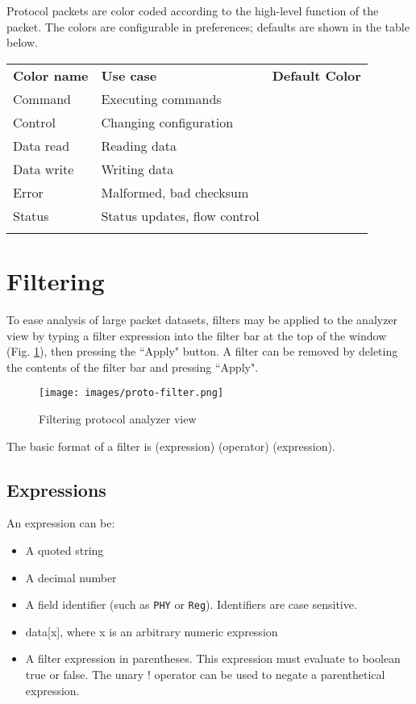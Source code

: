 Protocol packets are color coded according to the high-level function of the packet. The colors are configurable in
preferences; defaults are shown in the table below.

\begin{tabularx}{16cm}{llX}
\thickhline
\textbf{Color name} & \textbf{Use case} & \textbf{Default Color} \\
\thickhline
Command & Executing commands & \cellcolor{protocmd}\textcolor{white}{\#600050} \\
\thinhline
Control & Changing configuration & \cellcolor{protoctl}\textcolor{white}{\#808000} \\
\thinhline
Data read & Reading data & \cellcolor{protoread}\textcolor{white}{\#336699} \\
\thinhline
Data write & Writing data & \cellcolor{protowrite}\textcolor{white}{\#339966} \\
\thinhline
Error & Malformed, bad checksum & \cellcolor{protoerror}\textcolor{white}{\#ff0000} \\
\thinhline
Status & Status updates, flow control & \cellcolor{protostatus}\textcolor{white}{\#000080} \\
\thickhline
\end{tabularx}

\section{Filtering}

To ease analysis of large packet datasets, filters may be applied to the analyzer view by typing a filter expression
into the filter bar at the top of the window (Fig. \ref{proto-filter}), then pressing the ``Apply" button. A filter can
be removed by deleting the contents of the filter bar and pressing ``Apply".

\begin{figure}[H]
\centering
\texttt{[image: images/proto-filter.png]}
\caption{Filtering protocol analyzer view}
\label{proto-filter}
\end{figure}

The basic format of a filter is (expression) (operator) (expression).

\subsection{Expressions}

An expression can be:
\begin{itemize}
\item A quoted string
\item A decimal number
\item A field identifier (such as \texttt{PHY} or \texttt{Reg}). Identifiers are case sensitive.
\item data[x], where x is an arbitrary numeric expression
\item A filter expression in parentheses. This expression must evaluate to boolean true or false. The unary ! operator
can be used to negate a parenthetical expression.
\end{itemize}

